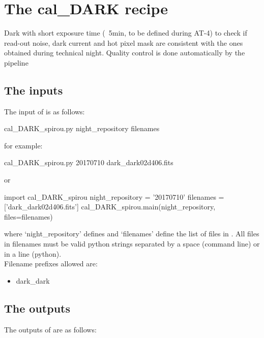 \section{The cal\_DARK recipe}
\label{ch:the_recipes:cal_DARK_spirou}

Dark with short exposure time (~5min, to be defined during AT-4) to check if read-out noise, dark current and hot pixel mask are consistent with the ones obtained during technical night. Quality control is done automatically by the pipeline \\


\subsection{The inputs}
The input of \calDARK is as follows:
\begin{cmdbox}
cal_DARK_spirou.py  night_repository  filenames
\end{cmdbox}
\noindent for example:
\begin{cmdbox}[title={example}]
cal_DARK_spirou.py 20170710 dark_dark02d406.fits
\end{cmdbox}
\noindent or
\begin{pythonbox}
import cal_DARK_spirou
night_repository = '20170710'
filenames = ['dark_dark02d406.fits']
cal_DARK_spirou.main(night_repository, files=filenames)
\end{pythonbox}

\noindent where `night\_repository' defines \argnightname and `filenames' define the list of files in \argfilenames. All files in filenames must be valid python strings separated by a space (command line) or in a line (python). \\

\noindent Filename prefixes allowed are:
\begin{itemize}
	\item dark\_dark
\end{itemize}

\subsection{The outputs}
The outputs of \calDARK are as follows:

